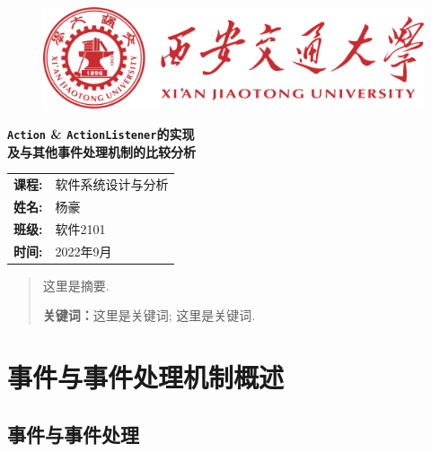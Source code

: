 \documentclass[12pt, a4paper, oneside]{ctexart}
\begin{document}
\thispagestyle{empty}

\begin{figure}[t]
    \centering
    \includegraphics[width=13cm]{logo1.png}
\end{figure}

\vspace*{\fill}
    \begin{center}
        \Huge\textbf{\lstinline{Action} \& \lstinline{ActionListener}的实现\\及与其他事件处理机制的比较分析}
    \end{center}
\vspace*{\fill}

\begin{table}[b]
    \centering
    \large
    \begin{tabular}{ll}
    \textbf{课程:} & 软件系统设计与分析 \\
    \textbf{姓名:} & 杨豪 \\
    \textbf{班级:} & 软件2101 \\
    \textbf{时间:} & 2022年9月 \\
    \end{tabular}
\end{table}

\newpage

\thispagestyle{empty}
\begin{abstract}
    这里是摘要. 
    \par\textbf{关键词：}这里是关键词; 这里是关键词. 
\end{abstract}

\newpage
{}
\setcounter{page}{1}
\tableofcontents
\newpage
\setcounter{page}{1}

\section{事件与事件处理机制概述}

\subsection{事件与事件处理}
\end{document}
